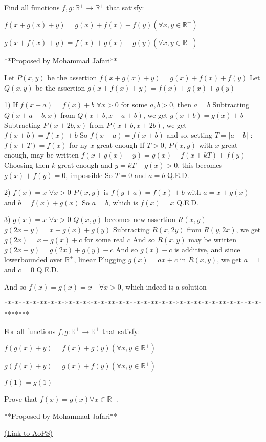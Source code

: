 \begin{solution}
	\begin{tcolorbox}Find all functions $f,g:\mathbb{R}^{+} \to \mathbb{R}^{+}$ that satisfy:

$f(x+g(x)+y)=g(x)+f(x)+f(y) (\forall x,y \in \mathbb{R}^{+})$

$g(x+f(x)+y)=f(x)+g(x)+g(y) (\forall x,y \in \mathbb{R}^{+})$

**Proposed by Mohammad Jafari**\end{tcolorbox}
Let $P(x,y)$ be the assertion $f(x+g(x)+y)=g(x)+f(x)+f(y)$
Let $Q(x,y)$ be the assertion $g(x+f(x)+y)=f(x)+g(x)+g(y)$

1) If $f(x+a)=f(x)+b$ $\forall x>0$ for some $a,b>0$, then $a=b$
Subtracting $Q(x+a+b,x)$ from $Q(x+b,x+a+b)$, we get $g(x+b)=g(x)+b$
Subtracting $P(x+2b,x)$ from $P(x+b,x+2b)$, we get $f(x+b)=f(x)+b$
So $f(x+a)=f(x+b)$ and so, setting $T=|a-b|$ : $f(x+T)=f(x)$ for ny $x$ great enough
If $T>0$, $P(x,y)$ with $x$ great enough, may be written 
$f(x+g(x)+y)=g(x)+f(x+kT)+f(y)$
Choosing then $k$ great enough and $y=kT-g(x)>0$, this becomes $g(x)+f(y)=0$, impossible
So $T=0$ and $a=b$
Q.E.D.

2) $f(x)=x$ $\forall x>0$
$P(x,y)$ is $f(y+a)=f(x)+b$ with $a=x+g(x)$ and $b=f(x)+g(x)$
So $a=b$, which is $f(x)=x$
Q.E.D.

3) $g(x)=x$ $\forall x>0$
$Q(x,y)$ becomes new assertion $R(x,y)$
$g(2x+y)=x+g(x)+g(y)$
Subtracting $R(x,2y)$ from $R(y,2x)$, we get $g(2x)=x+g(x)+c$ for some real $c$
And so $R(x,y)$ may be written $g(2x+y)=g(2x)+g(y)-c$
And so $g(x)-c$ is additive, and since lowerbounded over $\mathbb R^+$, linear
Plugging $g(x)=ax+c$ in $R(x,y)$, we get $a=1$ and $c=0$
Q.E.D.

And so $\boxed{f(x)=g(x)=x\quad\forall x>0}$, which indeed is a solution


\end{solution}
*******************************************************************************
-------------------------------------------------------------------------------

\begin{problem}
	For all functions $f,g:\mathbb{R}^{+} \to \mathbb{R}^{+}$ that satisfy:

$f(g(x)+y)=f(x)+g(y) (\forall x,y \in \mathbb{R}^{+})$

$g(f(x)+y)=g(x)+f(y) (\forall x,y \in \mathbb{R}^{+})$

$f(1)=g(1)$  

Prove that $f(x)=g(x) \forall x \in \mathbb{R}^{+}$.

**Proposed by Mohammad Jafari**

	\flushright \href{https://artofproblemsolving.com/community/c6h1611756}{(Link to AoPS)}
\end{problem}



